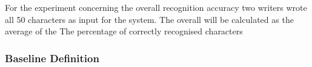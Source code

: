         For the experiment concerning the overall recognition accuracy 
        two writers wrote all 50 characters as input for the system.
        The overall will be calculated as the average of the 
        The percentage of correctly recognised characters






\subsubsection{Baseline Definition}
\label{sec:eval:baselinedefinition}






